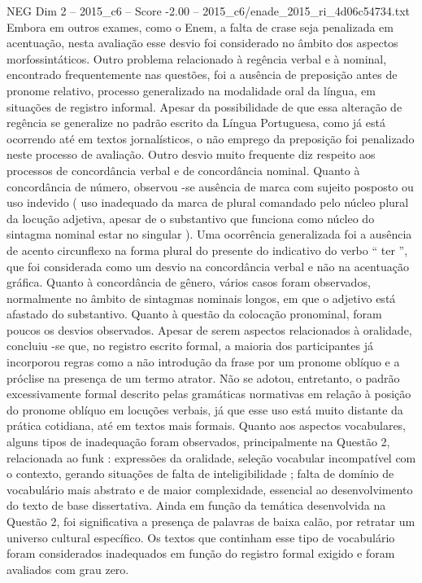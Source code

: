 \begin{textsample}{NEG Dim 2 – 2015\_c6 – Score -2.00 – 2015\_c6/enade\_2015\_ri\_4d06c54734.txt}
Embora em outros exames, como o Enem, a falta de crase seja penalizada em acentuação, nesta avaliação esse desvio foi considerado no âmbito dos aspectos morfossintáticos.
Outro problema relacionado à regência verbal e à nominal, encontrado frequentemente nas questões, foi a ausência de preposição antes de pronome relativo, processo generalizado na modalidade oral da língua, em situações de registro informal.
Apesar da possibilidade de que essa alteração de regência se generalize no padrão escrito da Língua Portuguesa, como já está ocorrendo até em textos jornalísticos, o não emprego da preposição foi penalizado neste processo de avaliação.
Outro desvio muito frequente diz respeito aos processos de concordância verbal e de concordância nominal.
Quanto à concordância de número, observou -se ausência de marca com sujeito posposto ou uso indevido ( uso inadequado da marca de plural comandado pelo núcleo plural da locução adjetiva, apesar de o substantivo que funciona como núcleo do sintagma nominal estar no singular ).
Uma ocorrência generalizada foi a ausência de acento circunflexo na forma plural do presente do indicativo do verbo “ ter ”, que foi considerada como um desvio na concordância verbal e não na acentuação gráfica.
Quanto à concordância de gênero, vários casos foram observados, normalmente no âmbito de sintagmas nominais longos, em que o adjetivo está afastado do substantivo.
Quanto à questão da colocação pronominal, foram poucos os desvios observados.
Apesar de serem aspectos relacionados à oralidade, concluiu -se que, no registro escrito formal, a maioria dos participantes já incorporou regras como a não introdução da frase por um pronome oblíquo e a próclise na presença de um termo atrator.
Não se adotou, entretanto, o padrão excessivamente formal descrito pelas gramáticas normativas em relação à posição do pronome oblíquo em locuções verbais, já que esse uso está muito distante da prática cotidiana, até em textos mais formais.
Quanto aos aspectos vocabulares, alguns tipos de inadequação foram observados, principalmente na Questão 2, relacionada ao funk : expressões da oralidade, seleção vocabular incompatível com o contexto, gerando situações de falta de inteligibilidade ; falta de domínio de vocabulário mais abstrato e de maior complexidade, essencial ao desenvolvimento do texto de base dissertativa.
Ainda em função da temática desenvolvida na Questão 2, foi significativa a presença de palavras de baixa calão, por retratar um universo cultural específico.
Os textos que continham esse tipo de vocabulário foram considerados inadequados em função do registro formal exigido e foram avaliados com grau zero.

\end{textsample}
